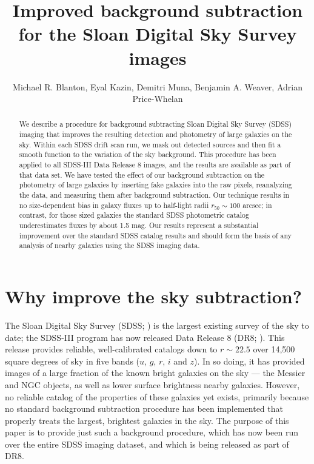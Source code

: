 \documentclass[10pt,preprint]{aastex}
\newcounter{address}
\begin{document}
\title{Improved background subtraction for the Sloan Digital Sky
  Survey images}


\author{
Michael R. Blanton\altaffilmark{\ref{NYU}},
Eyal Kazin\altaffilmark{\ref{NYU}},
Demitri Muna\altaffilmark{\ref{NYU}},
Benjamin A. Weaver\altaffilmark{\ref{NYU}},
Adrian Price-Whelan\altaffilmark{\ref{NYU}} 
}

\setcounter{address}{1}

\begin{abstract}
We describe a procedure for background subtracting Sloan Digital Sky
Survey (SDSS) imaging that improves the resulting detection and
photometry of large galaxies on the sky.  Within each SDSS drift scan
run, we mask out detected sources and then fit a smooth function to
the variation of the sky background.  This procedure has been applied
to all SDSS-III Data Release 8 images, and the results are available
as part of that data set.  We have tested the effect of our background
subtraction on the photometry of large galaxies by inserting fake
galaxies into the raw pixels, reanalyzing the data, and measuring them
after background subtraction.  Our technique results in no
size-dependent bias in galaxy fluxes up to half-light radii $r_{50}
\sim 100$ arcsec; in contrast, for those sized galaxies the standard
SDSS photometric catalog underestimates fluxes by about 1.5 mag. Our
results represent a substantial improvement over the standard SDSS
catalog results and should form the basis of any analysis of nearby
galaxies using the SDSS imaging data.
\end{abstract}

\section{Why improve the sky subtraction?}
\label{sec:intro}

The Sloan Digital Sky Survey (SDSS; \citealt{york00a}) is the largest
existing survey of the sky to date; the SDSS-III program has now
released Data Release 8 (DR8; \citealt{eisenstein11a, aihara11a}).
This release provides reliable, well-calibrated catalogs down to
$r\sim 22.5$ over 14,500 square degrees of sky in five bands ($u$,
$g$, $r$, $i$ and $z$).  In so doing, it has provided images of a
large fraction of the known bright galaxies on the sky --- the Messier
and NGC objects, as well as lower surface brightness nearby
galaxies. However, no reliable catalog of the properties of these
galaxies yet exists, primarily because no standard background
subtraction procedure has been implemented that properly treats the
largest, brightest galaxies in the sky. The purpose of this paper is
to provide just such a background procedure, which has now been run
over the entire SDSS imaging dataset, and which is being released as
part of DR8.
\end{document}
